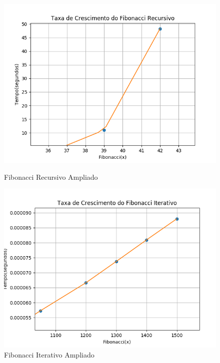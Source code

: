 \documentclass[a4paper, 12pt]{article}
\begin{document}
\begin{figure}[h]
\centering
\begin{minipage}[b]{0.45\linewidth}
\includegraphics[width=\linewidth]{../fibonacci_recursivo_zoom.png}
\caption{\scriptsize Fibonacci Recursivo Ampliado}
\end{minipage}
\hfill
\begin{minipage}[b]{0.45\linewidth}
\includegraphics[width=\linewidth]{../fibonacci_iterativo_zoom.png}
\caption{\scriptsize Fibonacci Iterativo Ampliado}
\end{minipage}
\end{figure} 
\end{document}
